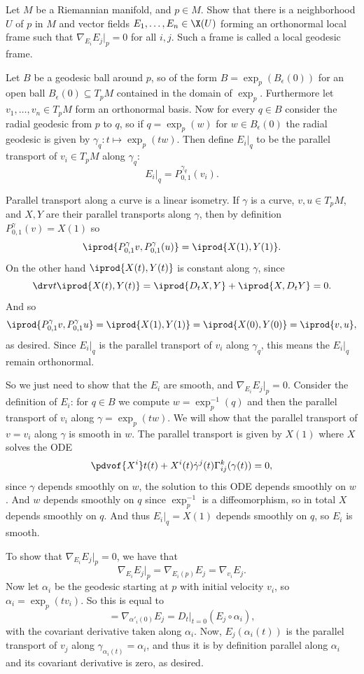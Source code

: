 \bprob[title={DoCarmo, Riemannian Geometry, page 83 problem 7}]

    Let $M$ be a Riemannian manifold, and $p\in M$.
    Show that there is a neighborhood $U$ of $p$ in $M$ and vector fields $E_1,\dots,E_n\in\X(U)$ forming an orthonormal local frame such that
    $\nabla_{E_i}E_j|_p=0$ for all $i,j$.
    Such a frame is called a {\emphcolor local geodesic frame}.

\eprob

Let $B$ be a geodesic ball around $p$, so of the form $B=\exp_p(B_\epsilon(0))$ for an open ball $B_\epsilon(0)\subseteq T_pM$ contained in the domain of $\exp_p$.
Furthermore let $v_1,\dots,v_n\in T_pM$ form an orthonormal basis.
Now for every $q\in B$ consider the radial geodesic from $p$ to $q$, so if $q=\exp_p(w)$ for $w\in B_\epsilon(0)$ the radial geodesic is given by $\gamma_q\colon t\mapsto\exp_p(tw)$.
Then define $E_i|_q$ to be the parallel transport of $v_i\in T_pM$ along $\gamma_q$:
$$ E_i|_q = P^{\gamma_q}_{0,1}(v_i) . $$

Parallel transport along a curve is a linear isometry.
If $\gamma$ is a curve, $v,u\in T_pM$, and $X,Y$ are their parallel transports along $\gamma$, then by definition $P^\gamma_{0,1}(v)=X(1)$ so
$$ \iprod{P^\gamma_{0,1}v,P^\gamma_{0,1}(u)} = \iprod{X(1),Y(1)} . $$
On the other hand $\iprod{X(t),Y(t)}$ is constant along $\gamma$, since
$$ \drv t\iprod{X(t),Y(t)} = \iprod{D_tX,Y} + \iprod{X,D_tY} = 0 . $$
And so
$$ \iprod{P^\gamma_{0,1}v,P^\gamma_{0,1}u} = \iprod{X(1),Y(1)} = \iprod{X(0),Y(0)} = \iprod{v,u} , $$
as desired.
Since $E_i|_q$ is the parallel transport of $v_i$ along $\gamma_q$, this means the $E_i|_q$ remain orthonormal.

So we just need to show that the $E_i$ are smooth, and $\nabla_{E_i}E_j|_p=0$.
Consider the definition of $E_i$: for $q\in B$ we compute $w=\exp_p^{-1}(q)$ and then the parallel transport of $v_i$ along $\gamma=\exp_p(tw)$.
We will show that the parallel transport of $v=v_i$ along $\gamma$ is smooth in $w$.
The parallel transport is given by $X(1)$ where $X$ solves the ODE
$$ \pdvof{X^i}t(t) + X^i(t)\dot\gamma^j(t)\Gamma^k_{ij}(\gamma(t)) = 0 , $$
since $\gamma$ depends smoothly on $w$, the solution to this ODE depends smoothly on $w$.
And $w$ depends smoothly on $q$ since $\exp_p^{-1}$ is a diffeomorphism, so in total $X$ depends smoothly on $q$.
And thus $E_i|_q=X(1)$ depends smoothly on $q$, so $E_i$ is smooth.

To show that $\nabla_{E_i}E_j|_p=0$, we have that
$$ \nabla_{E_i}E_j|_p = \nabla_{E_i(p)}E_j = \nabla_{v_i}E_j . $$
Now let $\alpha_i$ be the geodesic starting at $p$ with initial velocity $v_i$, so $\alpha_i=\exp_p(tv_i)$.
So this is equal to
$$ = \nabla_{\alpha'_i(0)}E_j = D_t|_{t=0}(E_j\circ\alpha_i) , $$
with the covariant derivative taken along $\alpha_i$.
Now, $E_j(\alpha_i(t))$ is the parallel transport of $v_j$ along $\gamma_{\alpha_i(t)}=\alpha_i$, and thus it is by definition parallel along $\alpha_i$ and its covariant
derivative is zero, as desired.

